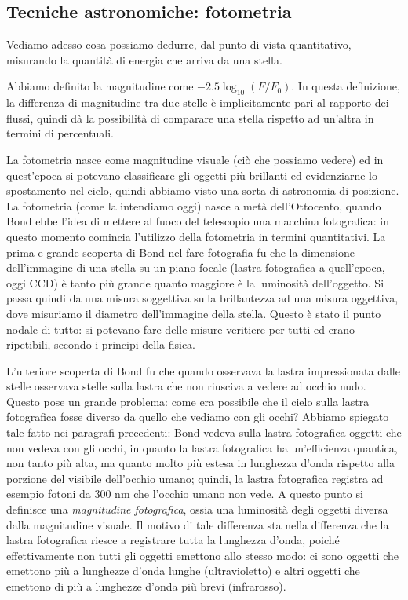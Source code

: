\subsection{Tecniche astronomiche: fotometria}

Vediamo adesso cosa possiamo dedurre, dal punto di vista quantitativo, misurando la quantità di energia che arriva da una stella.

Abbiamo definito la magnitudine come $-2.5 \log_{10} (F/F_0)$. In questa definizione, la differenza di magnitudine tra due stelle è implicitamente pari al rapporto dei flussi, quindi dà la possibilità di comparare una stella rispetto ad un'altra in termini di percentuali. %

La fotometria nasce come magnitudine visuale (ciò che possiamo vedere) ed in quest'epoca si potevano classificare gli oggetti più brillanti ed evidenziarne lo spostamento nel cielo, quindi abbiamo visto una sorta di astronomia di posizione. La fotometria (come la intendiamo oggi) nasce a metà dell'Ottocento, quando Bond ebbe l'idea di mettere al fuoco del telescopio una macchina fotografica: in questo momento comincia l'utilizzo della fotometria in termini quantitativi. La prima e grande scoperta di Bond nel fare fotografia fu che la dimensione dell'immagine di una stella su un piano focale (lastra fotografica a quell'epoca, oggi CCD) è tanto più grande quanto maggiore è la luminosità dell'oggetto. Si passa quindi da una misura soggettiva sulla brillantezza ad una misura oggettiva, dove misuriamo il diametro dell'immagine della stella. Questo è stato il punto nodale di tutto: si potevano fare delle misure veritiere per tutti ed erano ripetibili, secondo i principi della fisica.

L'ulteriore scoperta di Bond fu che quando osservava la lastra impressionata dalle stelle osservava stelle sulla lastra che non riusciva a vedere ad occhio nudo. Questo pose un grande problema: come era possibile che il cielo sulla lastra fotografica fosse diverso da quello che vediamo con gli occhi? Abbiamo spiegato tale fatto nei paragrafi precedenti: Bond vedeva sulla lastra fotografica oggetti che non vedeva con gli occhi, in quanto la lastra fotografica ha un'efficienza quantica, non tanto più alta, ma quanto molto più estesa in lunghezza d'onda rispetto alla porzione del visibile dell'occhio umano; quindi, la lastra fotografica registra ad esempio fotoni da 300 nm che l'occhio umano non vede. A questo punto si definisce una \textit{magnitudine fotografica}, ossia una luminosità degli oggetti diversa dalla magnitudine visuale. Il motivo di tale differenza sta nella differenza che la lastra fotografica riesce a registrare tutta la lunghezza d'onda, poiché effettivamente non tutti gli oggetti emettono allo stesso modo: ci sono oggetti che emettono più a lunghezze d'onda lunghe (ultravioletto) e altri oggetti che emettono di più a lunghezze d'onda più brevi (infrarosso).

